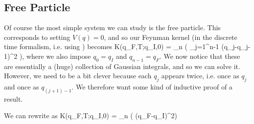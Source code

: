\subsection{Free Particle}

Of course the most simple system we can study is the free particle. This corresponds to setting $V(q)=0$, and so our Feynman kernel (in the discrete time formalism, i.e. using ) becomes
\be 
\label{eqn:FeynmanKernelFreeParticleOne}
    K(q_F,T;q_I,0) = \lim_{n\to\infty}   \int\Bigg[\prod_{i=1}^{n-2}\sqrt{\frac{-im}{2\pi\hbar \epsilon}} dq_i\Bigg] \exp\bigg( \sum_{j=1}^{n-1} (q_j-q_{j-1})^2 \bigg),
\ee 
where we also impose $q_0=q_I$ and $q_{n-1}=q_F$. We now notice that these are essentially a (huge) collection of Gaussian integrals, and so we can solve it. However, we need to be a bit clever because each $q_j$ appears twice, i.e. once as $q_j$ and once as $q_{(j+1)-1}$. We therefore want some kind of inductive proof of a result.

\bcl 
    We can rewrite  as 
    \bse 
        K(q_F,T;q_I,0) = \lim_{n\to\infty}  \Bigg[ \prod_{j=1}^{n-2} \sqrt{\frac{j}{j+1}} \Bigg] \exp \bigg(   (q_F-q_I)^2\bigg)
    \ese 
\ecl 

